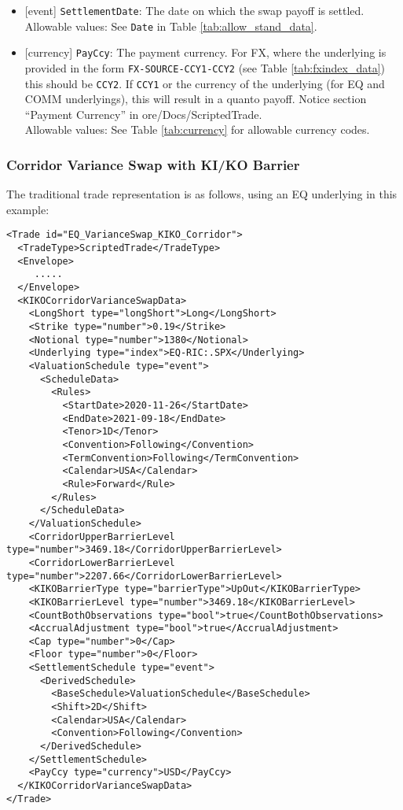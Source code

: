 \begin{itemize}
  \item{}[event] \lstinline!SettlementDate!: The date on which the swap payoff is settled. \\
  Allowable values: See \lstinline!Date! in Table \ref{tab:allow_stand_data}.
  \item{}[currency] \lstinline!PayCcy!: The payment currency. For FX, where the underlying is provided
      in the form \lstinline!FX-SOURCE-CCY1-CCY2! (see Table \ref{tab:fxindex_data}) this should
      be \lstinline!CCY2!. If \lstinline!CCY1! or the currency of the underlying (for EQ and
      COMM underlyings), this will result in a quanto payoff. Notice section ``Payment Currency'' in ore/Docs/ScriptedTrade. \\
        Allowable values: See Table \ref{tab:currency}  for allowable currency codes.
\end{itemize}

\subsubsection*{Corridor Variance Swap with KI/KO Barrier}

The traditional trade representation is as follows, using an EQ underlying in this example:

\begin{verbatim}
<Trade id="EQ_VarianceSwap_KIKO_Corridor">
  <TradeType>ScriptedTrade</TradeType>
  <Envelope>
     .....
  </Envelope>
  <KIKOCorridorVarianceSwapData>
    <LongShort type="longShort">Long</LongShort>
    <Strike type="number">0.19</Strike>
    <Notional type="number">1380</Notional>
    <Underlying type="index">EQ-RIC:.SPX</Underlying>
    <ValuationSchedule type="event">
      <ScheduleData>
        <Rules>
          <StartDate>2020-11-26</StartDate>
          <EndDate>2021-09-18</EndDate>
          <Tenor>1D</Tenor>
          <Convention>Following</Convention>
          <TermConvention>Following</TermConvention>
          <Calendar>USA</Calendar>
          <Rule>Forward</Rule>
        </Rules>
      </ScheduleData>
    </ValuationSchedule>
    <CorridorUpperBarrierLevel type="number">3469.18</CorridorUpperBarrierLevel>
    <CorridorLowerBarrierLevel type="number">2207.66</CorridorLowerBarrierLevel>
    <KIKOBarrierType type="barrierType">UpOut</KIKOBarrierType>
    <KIKOBarrierLevel type="number">3469.18</KIKOBarrierLevel>
    <CountBothObservations type="bool">true</CountBothObservations>
    <AccrualAdjustment type="bool">true</AccrualAdjustment>
    <Cap type="number">0</Cap>
    <Floor type="number">0</Floor>
    <SettlementSchedule type="event">
      <DerivedSchedule>
        <BaseSchedule>ValuationSchedule</BaseSchedule>
        <Shift>2D</Shift>
        <Calendar>USA</Calendar>
        <Convention>Following</Convention>
      </DerivedSchedule>
    </SettlementSchedule>
    <PayCcy type="currency">USD</PayCcy>
  </KIKOCorridorVarianceSwapData>
</Trade>
\end{verbatim}


